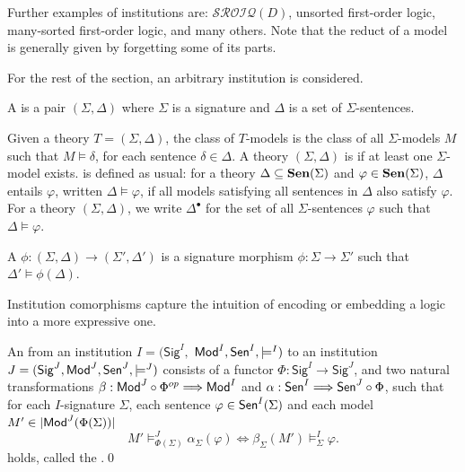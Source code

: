 \documentclass[10pt, a4paper]{isov2}
\newcommand{\Sig}{\mathsf{Sig}}
\begin{document}
Further examples of institutions are: $\mathcal{SROIQ}(D)$, unsorted first-order logic, 
many-sorted first-order logic, and many others.  Note that the reduct of a model 
is generally given by forgetting some of its parts.

For the rest of the section, an arbitrary institution is considered. 

\begin{definition}[Theory]
A  is a pair $(\Sigma,\Delta)$ where $\Sigma$ is a signature and $\Delta$ is a set of $\Sigma$-sentences.
\end{definition}

Given a theory $T=(\Sigma, \Delta)$, the class of $T$-models is the class of all
$\Sigma$-models $M$ such that $M\models \delta$, for each sentence $\delta \in \Delta$.
A theory $(\Sigma, \Delta)$ is  if at least one 
 $\Sigma$-model exists.  is defined as usual: 
for  a theory $\Delta\subseteq \mathbf {Sen}(\Sigma)$ and 
$\varphi\in \mathbf {Sen}(\Sigma)$, $\Delta$ entails $\varphi$, written $\Delta\models\varphi$, if all models satisfying all sentences in
$\Delta$ also satisfy $\varphi$. For a theory $(\Sigma, \Delta)$, we write $\Delta^\bullet$ for the set of all $\Sigma$-sentences $\varphi$ such that $\Delta \models \varphi$. 

\begin{definition}
A  $\phi: (\Sigma, \Delta) \rightarrow (\Sigma',  \Delta')$ is 
   a signature morphism $\phi:\Sigma\rightarrow \Sigma'$ such that $\Delta'\models \phi(\Delta)$.
\end{definition}
\medskip

Institution comorphisms capture the intuition of encoding or embedding a logic into a more expressive one.

\begin{definition} An  from an institution $I = (\Sig^I,$ $ \mathsf{Mod}^I, \mathsf{Sen}^I, \models^I)$ to an institution $J=(\Sig^J, \Mod^J,\Sen^J, \models^J)$ consists of a functor $\Phi : \Sig^I \longrightarrow \Sig^J$, and
two natural transformations $\beta: \mathsf{Mod}^J \circ \Phi^{op} \Longrightarrow \mathsf{Mod}^I$
and $\alpha: \mathsf{Sen}^I \Longrightarrow \mathsf{Sen}^J \circ \Phi$, such that 
for each $I$-signature $\Sigma$, each sentence $\varphi\in\mathsf{Sen}^I(\Sigma)$ and each model $M'\in|\mathsf{Mod}^J(\Phi(\Sigma))|$
%
\begin{equation*}
  M'\models^{J}_{\Phi(\Sigma)}\alpha_{\Sigma}(\varphi)
\iff
  \beta_{\Sigma}(M')\models^I_{\Sigma}\varphi.
\end{equation*}
%
holds, called the .\quad\qed
\end{definition}
\end{document}
